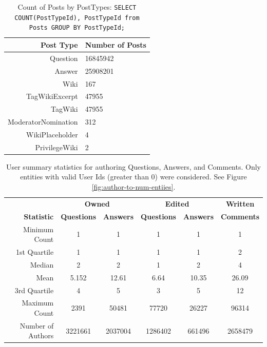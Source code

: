 \documentclass[a4paper,11pt, notitlepage]{report}
\theoremstyle{definition}
\numberwithin{equation}{section}		%
\begin{document}
\begin{table}[ht]
\centering
\begin{tabular}{rl}
\hline
\textbf{Post Type}      & \textbf{Number of Posts}  \\ \hline
Question            & 16845942  \\
Answer              & 25908201  \\
Wiki                & 167       \\
TagWikiExcerpt      & 47955     \\
TagWiki             & 47955     \\
ModeratorNomination & 312       \\
WikiPlaceholder     & 4         \\
PrivilegeWiki       & 2         \\
\end{tabular}
\caption{Count of Posts by PostTypes: \texttt{SELECT COUNT(PostTypeId), PostTypeId from Posts GROUP BY PostTypeId;}}
\label{post-type-counts}
\end{table}

\begin{table}[ht]
\centering
\begin{tabular}{r|cc|cc|c}
\hline
& \multicolumn{2}{c}{\textbf{Owned}} & \multicolumn{2}{c}{\textbf{Edited}} & \textbf{Written} \\
\textbf{Statistic} & \textbf{Questions} & \textbf{Answers} & \textbf{Questions} & \textbf{Answers} & \textbf{Comments} \\ \hline
Minimum Count       & 1     & 1     & 1     & 1     & 1     \\
1st Quartile        & 1     & 1     & 1     & 1     & 2     \\
Median              & 2     & 2     & 1     & 2     & 4     \\
Mean                & 5.152 & 12.61 & 6.64  & 10.35 & 26.09 \\
3rd Quartile        & 4     & 5     & 3     & 5     & 12    \\
Maximum Count       & 2391  & 50481 & 77720 & 26227 & 96314 \\ \hline
Number of Authors   & 3221661 & 2037004 & 1286402 & 661496 & 2658479 \\
\end{tabular}
\caption{User summary statistics for authoring Questions, Answers, and Comments. Only entities with valid User Ids (greater than 0) were considered. See Figure \ref{fig:author-to-num-entiies}.}
\label{table:author-to-num-entities}
\end{table}
\end{document}

